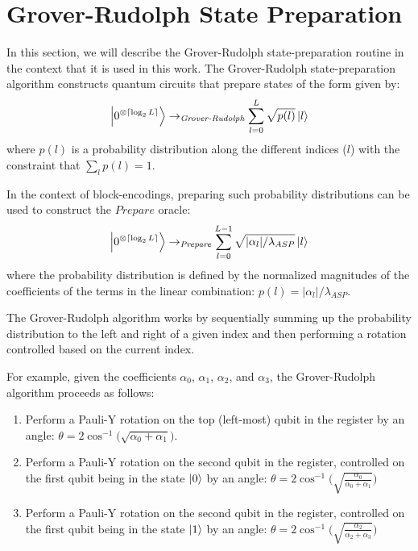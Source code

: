 \section{Grover-Rudolph State Preparation}
\label{sec:grover-rudolph}

In this section, we will describe the Grover-Rudolph state-preparation routine \cite{grover2002creating} in the context that it is used in this work.
The Grover-Rudolph state-preparation algorithm constructs quantum circuits that prepare states of the form given by:
\begin{equation}
    \ket{0^{\otimes \lceil \log_2{L} \rceil}} \rightarrow_{\textit{Grover-Rudolph}} \sum_{l=0}^L \sqrt{p(l)} \ket{l}
\end{equation}
where $p(l)$ is a probability distribution along the different indices ($l$) with the constraint that $\sum_l p(l) = 1$.

In the context of block-encodings, preparing such probability distributions can be used to construct the $Prepare$ oracle:
\begin{equation}
    \ket{0^{\otimes \lceil \log_2{L} \rceil}} \rightarrow_{\textit{Prepare}} \sum_{l = 0}^{L-1} \sqrt{|\alpha_l| / \lambda_{ASP}} \ket{l}
\end{equation}
where the probability distribution is defined by the normalized magnitudes of the coefficients of the terms in the linear combination: $p(l) = |\alpha_l| / \lambda_{ASP}$.

The Grover-Rudolph algorithm works by sequentially summing up the probability distribution to the left and right of a given index and then performing a rotation controlled based on the current index.

For example, given the coefficients $\alpha_0$, $\alpha_1$, $\alpha_2$, and $\alpha_3$, the Grover-Rudolph algorithm proceeds as follows:
\begin{enumerate}
    \item Perform a Pauli-Y rotation on the top (left-most) qubit in the register by an angle: $\theta = 2 \cos^{-1}\big( \sqrt{\alpha_0 + \alpha_1} \big)$.
    \item Perform a Pauli-Y rotation on the second qubit in the register, controlled on the first qubit being in the state $\ket{0}$ by an angle: $\theta = 2 \cos^{-1}\big( \sqrt{\frac{\alpha_0}{\alpha_0 + \alpha_1}} \big)$
    \item Perform a Pauli-Y rotation on the second qubit in the register, controlled on the first qubit being in the state $\ket{1}$ by an angle: $\theta = 2 \cos^{-1}\big( \sqrt{\frac{\alpha_2}{\alpha_2 + \alpha_3}} \big)$
\end{enumerate}

